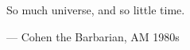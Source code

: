 \begin{flushright}
\begin{hangleftquote}{\QENOpen}{\QENClose}
So much universe, and so little time.
\end{hangleftquote}
\par\smallskip
\normalfont — Cohen the Barbarian, AM 1980s
\end{flushright}
